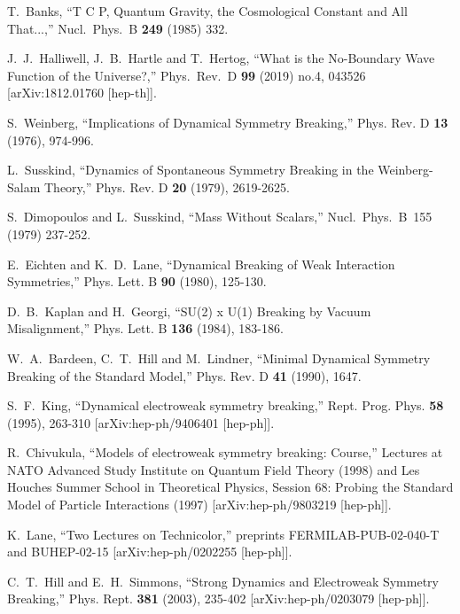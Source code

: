 \documentclass[12pt]{article}
\numberwithin{equation}{section}
\begin{document}
\begin{thebibliography}{999}
  T.~Banks,
  ``T C P, Quantum Gravity, the Cosmological Constant 
  and All That...,''  Nucl.\ Phys.\ B {\bf 249} (1985) 332.

  J.~J.~Halliwell, J.~B.~Hartle and T.~Hertog,
  ``What is the No-Boundary Wave Function of the Universe?,''
  Phys.\ Rev.\ D {\bf 99} (2019) no.4,  043526
  [arXiv:1812.01760 [hep-th]].

S.~Weinberg,
``Implications of Dynamical Symmetry Breaking,''
Phys. Rev. D \textbf{13} (1976), 974-996.

L.~Susskind, ``Dynamics of Spontaneous Symmetry Breaking in the Weinberg-Salam Theory,''
Phys. Rev. D \textbf{20} (1979), 2619-2625.

S.~Dimopoulos and L.~Susskind,
``Mass Without Scalars,'' Nucl.~Phys.~B~155 (1979) 237-252.

E.~Eichten and K.~D.~Lane,
``Dynamical Breaking of Weak Interaction Symmetries,''
Phys. Lett. B \textbf{90} (1980), 125-130.

D.~B.~Kaplan and H.~Georgi,
``SU(2) x U(1) Breaking by Vacuum Misalignment,''
Phys. Lett. B \textbf{136} (1984), 183-186.

W.~A.~Bardeen, C.~T.~Hill and M.~Lindner,
``Minimal Dynamical Symmetry Breaking of the Standard Model,'' Phys. Rev. D \textbf{41} (1990), 1647.

S.~F.~King,
``Dynamical electroweak symmetry breaking,''
Rept. Prog. Phys. \textbf{58} (1995), 263-310
[arXiv:hep-ph/9406401 [hep-ph]].

R.~Chivukula, ``Models of electroweak symmetry breaking: Course,'' Lectures at NATO Advanced Study Institute on Quantum Field Theory (1998) and Les Houches Summer School in Theoretical Physics, Session 68: Probing the Standard Model of Particle Interactions (1997)
[arXiv:hep-ph/9803219 [hep-ph]].
  
K.~Lane, ``Two Lectures on Technicolor,'' preprints 
FERMILAB-PUB-02-040-T and BUHEP-02-15 [arXiv:hep-ph/0202255 [hep-ph]].  

C.~T.~Hill and E.~H.~Simmons,
``Strong Dynamics and Electroweak Symmetry Breaking,''
Phys. Rept. \textbf{381} (2003), 235-402
[arXiv:hep-ph/0203079 [hep-ph]].


\end{thebibliography}
\end{document}
